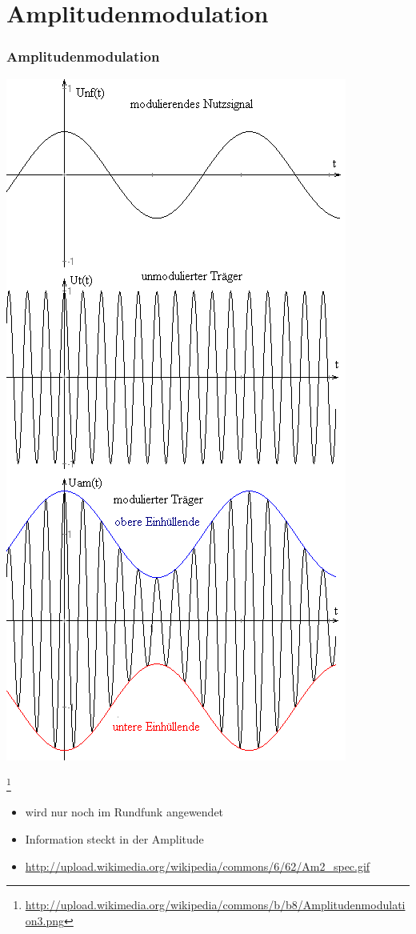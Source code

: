 \section{Amplitudenmodulation}
\begin{frame}
\frametitle{Amplitudenmodulation}
\begin{minipage}{0.4\textwidth}
\includegraphics[scale=0.24]{e14/AM1.png}\\
\end{minipage}
\footnote{\url{http://upload.wikimedia.org/wikipedia/commons/b/b8/Amplitudenmodulation3.png}}
\hspace{0.5cm}
\begin{minipage}{0.4\textwidth}	
	\begin{itemize}
		\item wird nur noch im Rundfunk angewendet
		\item Information steckt in der Amplitude
		\item \url{http://upload.wikimedia.org/wikipedia/commons/6/62/Am2_spec.gif}
	\end{itemize}
\end{minipage}
\end{frame}

